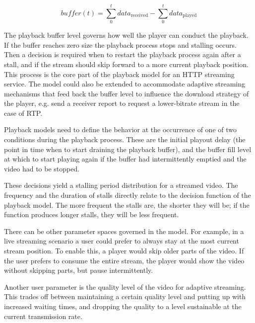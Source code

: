 \begin{equation*}
\mathit{buffer}(t) = \sum_{0}^{t} data_\mathrm{received} - \sum_{0}^{t} data_\mathrm{played}
\end{equation*}
 
The playback buffer level governs how well the player can conduct the playback. If the buffer reaches zero size the playback process stops and stalling occurs. Then a decision is required when to restart the playback process again after a stall, and if the stream should skip forward to a more current playback position. This process is the core part of the playback model for an HTTP streaming service. The model could also be extended to accommodate adaptive streaming mechanisms that feed back the buffer level to influence the download strategy of the player, e.g. send a receiver report to request a lower-bitrate stream in the case of RTP. %

Playback models need to define the behavior at the occurrence of one of two conditions during the playback process. These are the initial playout delay (the point in time when to start draining the playback buffer), and the buffer fill level at which to start playing again if the buffer had intermittently emptied and the video had to be stopped.

These decisions yield a stalling period distribution for a streamed video. The frequency and the duration of stalls directly relate to the decision function of the playback model. The more frequent the stalls are, the shorter they will be; if the function produces longer stalls, they will be less frequent.

There can be other parameter spaces governed in the model. For example, in a live streaming scenario a user could prefer to always stay at the most current stream position. To enable this, a player would skip older parts of the video. If the user prefers to consume the entire stream, the player would show the video without skipping parts, but pause intermittently. 

Another user parameter is the quality level of the video for adaptive streaming. This trades off between maintaining a certain quality level and putting up with increased waiting times, and dropping the quality to a level sustainable at the current transmission rate.


